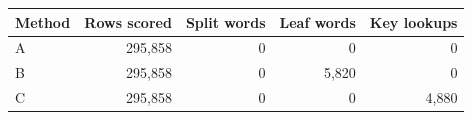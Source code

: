 \begin{tabular}{lrrrr}
\toprule
Method & Rows scored & Split words & Leaf words & Key lookups \\
\midrule
A & 295,858 & 0 & 0 & 0 \\
B & 295,858 & 0 & 5,820 & 0 \\
C & 295,858 & 0 & 0 & 4,880 \\
\bottomrule
\end{tabular}
